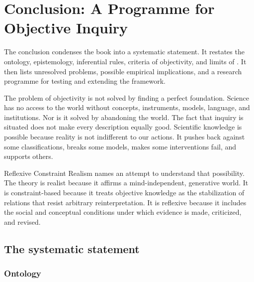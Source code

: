 \chapter{Conclusion: A Programme for Objective Inquiry}
\label{ch:conclusion}

\begin{chapterguide}
The conclusion condenses the book into a systematic statement. It restates the
ontology, epistemology, inferential rules, criteria of objectivity, and limits
of \RCR. It then lists unresolved problems, possible empirical implications,
and a research programme for testing and extending the framework.
\end{chapterguide}

The problem of objectivity is not solved by finding a perfect foundation.
Science has no access to the world without concepts, instruments, models,
language, and institutions. Nor is it solved by abandoning the world. The
fact that inquiry is situated does not make every description equally good.
Scientific knowledge is possible because reality is not indifferent to our
actions. It pushes back against some classifications, breaks some models,
makes some interventions fail, and supports others.

Reflexive Constraint Realism names an attempt to understand that possibility.
The theory is realist because it affirms a mind-independent, generative world.
It is constraint-based because it treats objective knowledge as the
stabilization of relations that resist arbitrary reinterpretation. It is
reflexive because it includes the social and conceptual conditions under which
evidence is made, criticized, and revised.

\section{The systematic statement}

\subsection{Ontology}


